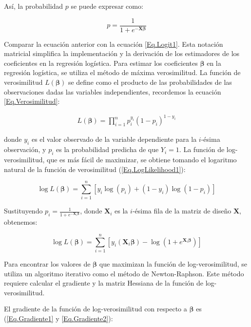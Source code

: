 Así, la probabilidad $p$ se puede expresar como:

\begin{equation}\label{Eq.Logit2}
p = \frac{1}{1 + e^{-\mathbf{X} \boldsymbol{\beta}}}
\end{equation}

Comparar la ecuaci\'on anterior con la ecuaci\'on \ref{Eq.Logit1}. Esta notación matricial simplifica la implementación y la derivación de los estimadores de los coeficientes en la regresión logística. Para estimar los coeficientes $\boldsymbol{\beta}$ en la regresión logística, se utiliza el método de máxima verosimilitud. La función de verosimilitud $L(\boldsymbol{\beta})$ se define como el producto de las probabilidades de las observaciones dadas las variables independientes, recordemos la ecuaci\'on \ref{Eq.Verosimilitud}:

\begin{eqnarray}
L(\boldsymbol{\beta}) = \prod_{i=1}^{n} p_i^{y_i} (1 - p_i)^{1 - y_i}
\end{eqnarray}


donde $y_i$ es el valor observado de la variable dependiente para la $i$-ésima observación, y $p_i$ es la probabilidad predicha de que $Y_i = 1$.  La función de log-verosimilitud, que es más fácil de maximizar, se obtiene tomando el logaritmo natural de la función de verosimilitud (\ref{Eq.LogLikelihood1}):

\begin{equation}
\log L(\boldsymbol{\beta}) = \sum_{i=1}^{n} \left[ y_i \log(p_i) + (1 - y_i) \log(1 - p_i) \right]
\end{equation}

Sustituyendo $p_i = \frac{1}{1 + e^{-\mathbf{X}_i \boldsymbol{\beta}}}$, donde $\mathbf{X}_i$ es la $i$-ésima fila de la matriz de diseño $\mathbf{X}$, obtenemos:

\begin{equation}\label{Eq.LogLikelihood2}
\log L(\boldsymbol{\beta}) = \sum_{i=1}^{n} \left[ y_i (\mathbf{X}_i \boldsymbol{\beta}) - \log(1 + e^{\mathbf{X}_i \boldsymbol{\beta}}) \right]
\end{equation}

Para encontrar los valores de $\boldsymbol{\beta}$ que maximizan la función de log-verosimilitud, se utiliza un algoritmo iterativo como el método de Newton-Raphson. Este método requiere calcular el gradiente y la matriz Hessiana de la función de log-verosimilitud.


El gradiente de la función de log-verosimilitud con respecto a $\boldsymbol{\beta}$ es (\ref{Eq.Gradiente1} y \ref{Eq.Gradiente2}):


